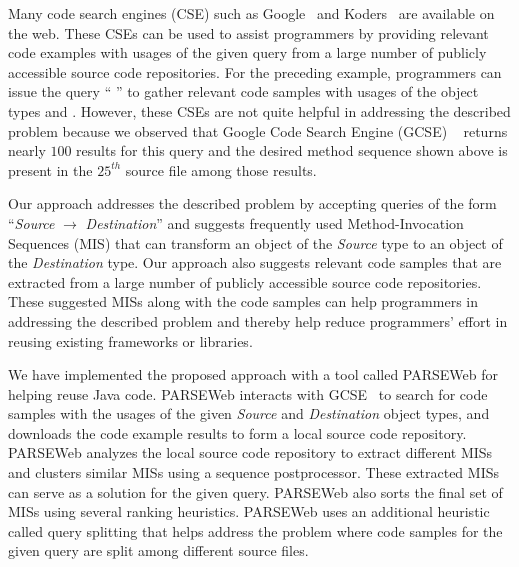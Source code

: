 \documentclass{fp035-thummalapenta}
\begin{document}
Many code search engines (CSE) such as Google~\cite{GCSE} and
Koders~\cite{KODERS} are
available on the web. These CSEs can be used to assist programmers
by providing relevant code examples with usages of the given query
from a large number of publicly accessible source code repositories.
For the preceding example, programmers can issue the query
`` '' to gather
relevant code samples with usages of the object types
 and . However, these
CSEs are not quite helpful in addressing the described problem
because we observed that Google Code Search Engine (GCSE)
~\cite{GCSE} returns nearly $100$ results for this
query and the desired method sequence shown above is present in the
$25^{th}$ source file among those results.

Our approach addresses the described problem by accepting
queries of the form ``\emph{Source} $\rightarrow$
\emph{Destination}'' and suggests frequently used Method-Invocation
Sequences (MIS) that can transform an object of the \emph{Source}
type to an object of the \emph{Destination} type. Our approach also
suggests relevant code samples that are extracted from a large
number of publicly accessible source code repositories. These
suggested MISs along with the code samples can help programmers in
addressing the described problem and thereby help reduce
programmers' effort in reusing existing frameworks or libraries.

We have implemented the proposed approach with a tool called
PARSEWeb for helping reuse Java code. PARSEWeb interacts with
GCSE~\cite{GCSE} to search for code samples with the usages of the
given \emph{Source} and \emph{Destination} object types, and
downloads the code example results to form a local source code
repository. PARSEWeb analyzes the local source code repository to
extract different MISs and clusters similar MISs using a
sequence postprocessor. These extracted MISs can serve as a solution for
the given query. PARSEWeb also sorts the final set of MISs using
several ranking heuristics. PARSEWeb uses an additional heuristic
called query splitting that helps address the problem where
code samples for the given query are split among different source
files.
\end{document}
